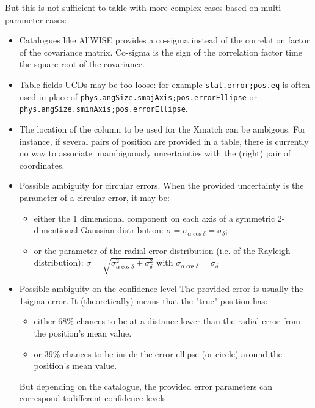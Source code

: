 \documentclass[11pt,a4paper]{ivoa}
\begin{document}
But this is not sufficient to takle with more complex cases based on multi-parameter cases: 

\begin{itemize}
	\item Catalogues like AllWISE provides a co-sigma instead of the correlation factor of the covariance matrix.
	Co-sigma is the sign of the correlation factor time the square root of the covariance.
	\item Table fields UCDs  may be too loose: for example  \texttt{stat.error;pos.eq} is often used in place of \texttt{phys.angSize.smajAxis;pos.errorEllipse} or \texttt{phys.angSize.sminAxis;pos.errorEllipse}.
	\item The location  of the column to be used for the Xmatch can be ambigous. For instance, if several pairs of position are provided in a table, there is currently 
	no way to associate unambiguously uncertainties with the (right) pair of coordinates.
	\item  Possible ambiguity for circular errors. When the provided uncertainty is the parameter of a circular error, it may be:
	\begin{itemize}
		\item either the 1 dimensional component on each axis of a symmetric 2-dimentional Gaussian distribution: $\sigma=\sigma_{\alpha\cos\delta}=\sigma_\delta$;
		\item or the parameter of the radial error distribution (i.e. of the Rayleigh distribution): $\sigma=\sqrt{\sigma_{\alpha\cos\delta}^2 + \sigma_\delta^2}$
                 with $\sigma_{\alpha\cos\delta} = \sigma_\delta$
         \end{itemize}

	\item   Possible ambiguity on the confidence level
	The provided error is usually the 1sigma error.
	It (theoretically) means that the "true" position has:
	\begin{itemize}	
		\item either 68\% chances to be at a distance lower than the radial error from the position's mean value.
		\item or 39\% chances to be inside the error ellipse (or circle) around the position's mean value.
	\end{itemize}
	But depending on the catalogue, the provided error parameters can correspond todifferent confidence levels.

\end{itemize}
\end{document}
